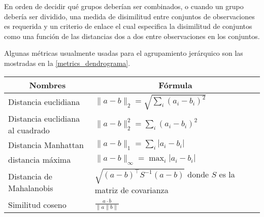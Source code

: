 En orden de decidir qué grupos deberían ser combinados, o cuando un grupo debería ser dividido, una medida de disimilitud entre conjuntos de observaciones es requerida y un criterio de enlace el cual especifica la disimilitud de conjuntos como una función de las distancias dos a dos entre observaciones en los conjuntos.

Algunas métricas usualmente usadas para el agrupamiento jerárquico son las mostradas en la \autoref{metrics_dendrograma}.

\begin{table}[h!]
	\begin{tabular}{|l|l|}
		\hline \multicolumn{1}{|c|}{ Nombres } & \multicolumn{1}{|c|}{ Fórmula } \\
		\hline Distancia euclidiana & $\|a-b\|_{2}=\sqrt{\sum_{i}\left(a_{i}-b_{i}\right)^{2}}$ \\
		\hline Distancia euclidiana al cuadrado & $\|a-b\|_{2}^{2}=\sum_{i}\left(a_{i}-b_{i}\right)^{2}$ \\
		\hline Distancia Manhattan & $\|a-b\|_{1}=\sum_{i}\left|a_{i}-b_{i}\right|$ \\
		\hline distancia máxima & $\|a-b\|_{\infty}=\max _{i}\left|a_{i}-b_{i}\right|$ \\
		\hline Distancia de Mahalanobis & $\sqrt{(a-b)^{\top} S^{-1}(a-b)}$ donde $S$ es la matriz de covarianza \\
		\hline Similitud coseno & $\frac{a \cdot b}{\|a\| b \|}$ \\
		\hline
	\end{tabular}
	\label{metrics_dendrograma}
\end{table}


